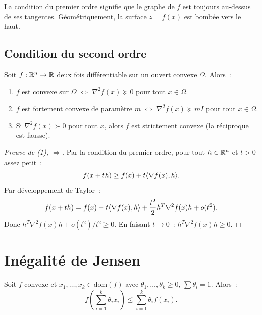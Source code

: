 \begin{intuition}
La condition du premier ordre signifie que le graphe de $f$ est toujours au-dessus
de ses tangentes. G\'eom\'etriquement, la surface $z = f(x)$ est \og{}bomb\'ee vers
le haut\fg.
\end{intuition}

\subsection{Condition du second ordre}

\begin{theoreme}
\label{thm:second_ordre}
Soit $f : \mathbb{R}^n \to \mathbb{R}$ deux fois diff\'erentiable sur un ouvert convexe $\Omega$. Alors~:
\begin{enumerate}
    \item $f$ est convexe sur $\Omega$ $\Leftrightarrow$ $\nabla^2 f(x) \succeq 0$
          pour tout $x \in \Omega$.
    \item $f$ est fortement convexe de param\`etre $m$ $\Leftrightarrow$
          $\nabla^2 f(x) \succeq mI$ pour tout $x \in \Omega$.
    \item Si $\nabla^2 f(x) \succ 0$ pour tout $x$, alors $f$ est strictement convexe
          (la r\'eciproque est fausse).
\end{enumerate}
\end{theoreme}

\begin{proof}[Preuve de (1), $\Rightarrow$]
Par la condition du premier ordre, pour tout $h \in \mathbb{R}^n$ et $t > 0$ assez petit~:
\[
    f(x + th) \geq f(x) + t\langle \nabla f(x), h \rangle.
\]
Par d\'eveloppement de Taylor~:
\[
    f(x+th) = f(x) + t\langle \nabla f(x), h \rangle + \frac{t^2}{2}h^T\nabla^2 f(x)h + o(t^2).
\]
Donc $h^T\nabla^2 f(x)h + o(t^2)/t^2 \geq 0$. En faisant $t \to 0$~:
$h^T\nabla^2 f(x)h \geq 0$.
\end{proof}

\section{In\'egalit\'e de Jensen}

\begin{theoreme}
Soit $f$ convexe et $x_1, \ldots, x_k \in \mathrm{dom}(f)$ avec
$\theta_1, \ldots, \theta_k \geq 0$, $\sum \theta_i = 1$. Alors~:
\[
    f\left(\sum_{i=1}^k \theta_i x_i\right) \leq \sum_{i=1}^k \theta_i f(x_i).
\]
\end{theoreme}

